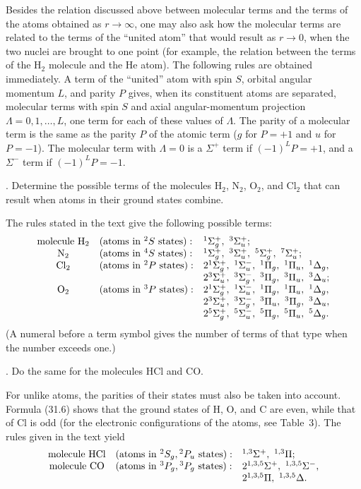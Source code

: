 Besides the relation discussed above between molecular terms and the terms of the atoms obtained as $r\to\infty$, one may also ask how the molecular terms are related to the terms of the ``united atom'' that would result as $r\to0$, when the two nuclei are brought to one point (for example, the relation between the terms of the $\mathrm H_2$ molecule and the He atom). The following rules are obtained immediately. A term of the ``united'' atom with spin $S$, orbital angular momentum $L$, and parity $P$ gives, when its constituent atoms are separated, molecular terms with spin $S$ and axial angular-momentum projection $\Lambda=0,1,\ldots,L$, one term for each of these values of $\Lambda$. The parity of a molecular term is the same as the parity $P$ of the atomic term ($g$ for $P=+1$ and $u$ for $P=-1$). The molecular term with $\Lambda=0$ is a $\Sigma^+$ term if $(-1)^LP=+1$, and a $\Sigma^-$ term if $(-1)^LP=-1$.

. Determine the possible terms of the molecules $\mathrm H_2$, $\mathrm N_2$, $\mathrm O_2$, and $\mathrm{Cl}_2$ that can result when atoms in their ground states combine.

\SolutionHeading The rules stated in the text give the following possible terms:
\[
\begin{array}{c@{\quad}l@{\quad}l}
\text{molecule }\mathrm H_2& (\text{atoms in }{}^2S\text{ states}):&{}^1\Sigma_g^+,\ {}^3\Sigma_u^+;\\
\mathrm N_2&(\text{atoms in }{}^4S\text{ states}):&{}^1\Sigma_g^+,\ {}^3\Sigma_u^+,\ {}^5\Sigma_g^+,\ {}^7\Sigma_u^+;\\
\mathrm{Cl}_2&(\text{atoms in }{}^2P\text{ states}):&2{}^1\Sigma_g^+,\ {}^1\Sigma_u^-,\ {}^1\Pi_g,\ {}^1\Pi_u,\ {}^1\Delta_g,\\
&&2{}^3\Sigma_u^+,\ {}^3\Sigma_g^-,\ {}^3\Pi_g,\ {}^3\Pi_u,\ {}^3\Delta_u;\\
\mathrm O_2&(\text{atoms in }{}^3P\text{ states}):&2{}^1\Sigma_g^+,\ {}^1\Sigma_u^-,\ {}^1\Pi_g,\ {}^1\Pi_u,\ {}^1\Delta_g,\\
&&2{}^3\Sigma_u^+,\ {}^3\Sigma_g^-,\ {}^3\Pi_u,\ {}^3\Pi_g,\ {}^3\Delta_u,\\
&&2{}^5\Sigma_g^+,\ {}^5\Sigma_u^-,\ {}^5\Pi_g,\ {}^5\Pi_u,\ {}^5\Delta_g.
\end{array}
\]
(A numeral before a term symbol gives the number of terms of that type when the number exceeds one.)

. Do the same for the molecules HCl and CO.

\SolutionHeading For unlike atoms, the parities of their states must also be taken into account. Formula (31.6) shows that the ground states of H, O, and C are even, while that of Cl is odd (for the electronic configurations of the atoms, see Table~3). The rules given in the text yield
\[
\begin{array}{c@{\quad}l@{\quad}l}
\text{molecule HCl}&(\text{atoms in }{}^2S_g,{}^2P_u\text{ states}):&{}^{1,3}\Sigma^+,\ {}^{1,3}\Pi;\\
\text{molecule CO}&(\text{atoms in }{}^3P_g,{}^3P_g\text{ states}):&2{}^{1,3,5}\Sigma^+,\ {}^{1,3,5}\Sigma^-,\\
&&2{}^{1,3,5}\Pi,\ {}^{1,3,5}\Delta.
\end{array}
\]

